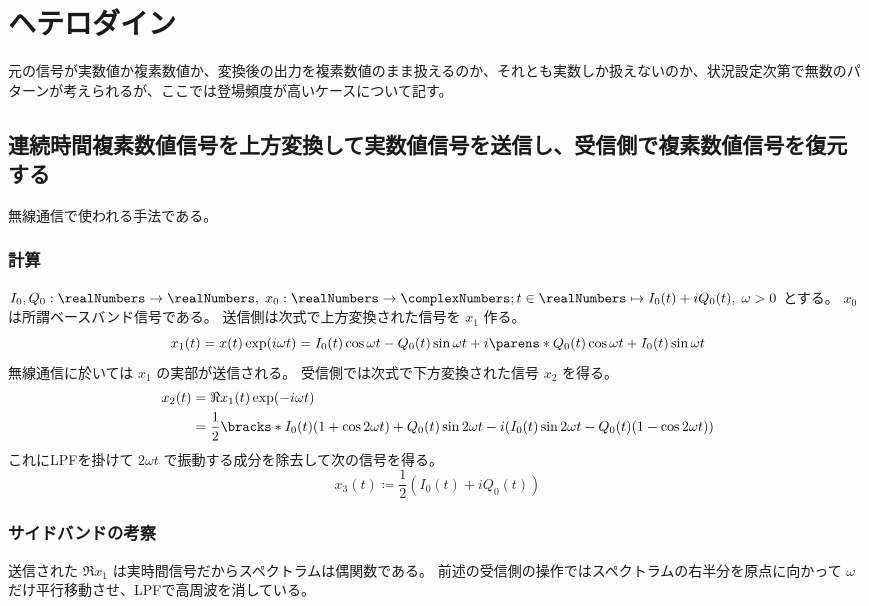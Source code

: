 \chapter{ヘテロダイン}
    元の信号が実数値か複素数値か、変換後の出力を複素数値のまま扱えるのか、それとも実数しか扱えないのか、状況設定次第で無数のパターンが考えられるが、ここでは登場頻度が高いケースについて記す。
    \section{連続時間複素数値信号を上方変換して実数値信号を送信し、受信側で複素数値信号を復元する}
        無線通信で使われる手法である。
        \subsection{計算}
            $I_0, Q_0:\realNumbers\to\realNumbers,\;x_0:\realNumbers\to\complexNumbers; t\in\realNumbers\mapsto I_0(t) + iQ_0(t),\;\omega > 0$ とする。
            $x_0$ は所謂ベースバンド信号である。
            送信側は次式で上方変換された信号を $x_1$ 作る。
            \[ x_1(t) = x(t)\exp(i\omega t) = I_0(t)\cos\omega t - Q_0(t)\sin\omega t + i\parens*{Q_0(t)\cos\omega t + I_0(t)\sin\omega t} \]
            無線通信に於いては $x_1$ の実部が送信される。
            受信側では次式で下方変換された信号 $x_2$ を得る。
            \begin{align*}
                x_2(t) &= \Re{x_1(t)}\exp(-i\omega t) \\
                &= \frac{1}{2}\bracks*{I_0(t)(1+\cos 2\omega t) + Q_0(t)\sin 2\omega t - i(I_0(t)\sin 2\omega t - Q_0(t)(1-\cos 2\omega t))}
            \end{align*}
            これにLPFを掛けて $2\omega t$ で振動する成分を除去して次の信号を得る。
            \[ x_3(t) \coloneq \frac{1}{2}(I_0(t) + iQ_0(t)) \]
        \subsection{サイドバンドの考察}
            送信された $\Re{x_1}$ は実時間信号だからスペクトラムは偶関数である。
            前述の受信側の操作ではスペクトラムの右半分を原点に向かって $\omega$ だけ平行移動させ、LPFで高周波を消している。
